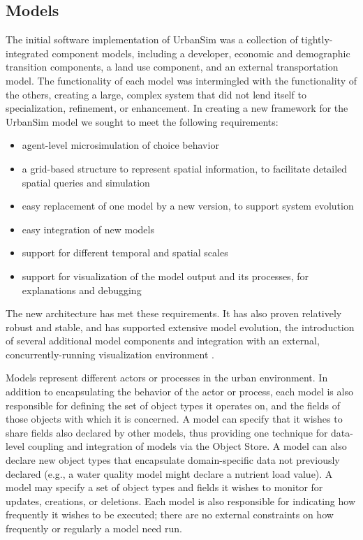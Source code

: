 
\subsection{Models}
\label{sec:models}

The initial software implementation of UrbanSim
\citep{waddell-asce-1998} was a collection of tightly-integrated
component models, including a developer, economic and demographic
transition components, a land use component, and an external
transportation model.  The functionality of each model was
intermingled with the functionality of the others, creating a
large, complex system that did not lend itself to specialization,
refinement, or enhancement. In creating a new framework for the
UrbanSim model we sought to meet the following requirements:

\begin{itemize}
\tight
\item agent-level microsimulation of choice behavior

\item a grid-based structure to represent spatial information,
to facilitate detailed spatial queries and simulation

\item easy replacement of one model by a new version, to support system
evolution

\item easy integration of new models

\item support for different temporal and spatial scales

\item support for visualization of the model output and its processes,
for explanations and debugging

\end{itemize}

The new architecture has met these requirements.  It has also
proven relatively robust and stable, and has supported extensive
model evolution, the introduction of several additional model
components and integration with an external, concurrently-running
visualization environment \citep{pinnel-vissym-2000}.

Models represent different actors or processes in the urban
environment. In addition to encapsulating the behavior of the
actor or process, each model is also responsible for defining the
set of object types it operates on, and the fields of those
objects with which it is concerned.  A model can specify that it
wishes to share fields also declared by other models, thus
providing one technique for data-level coupling and integration of
models via the Object Store.  A model can also declare new object
types that encapsulate domain-specific data not previously
declared (e.g., a water quality model might declare a nutrient
load value).  A model may specify a set of object types and fields
it wishes to monitor for updates, creations, or deletions.  Each
model is also responsible for indicating how frequently it wishes
to be executed; there are no external constraints on how
frequently or regularly a model need run.

